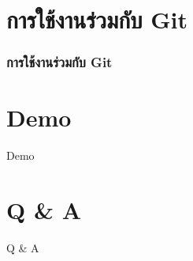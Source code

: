 \documentclass[xetex,serif,aspectratio=169]{beamer}
\begin{document}
\section{การใช้งานร่วมกับ Git}
\begin{frame}
    \frametitle{การใช้งานร่วมกับ Git}
\end{frame}

\section{Demo}
\begin{frame}[c]{ }
    \centering
    \Huge{Demo}
\end{frame}

\section{Q \& A}
\begin{frame}[c]{ }
    \centering
    \Huge{Q \& A}
\end{frame}
\end{document}
